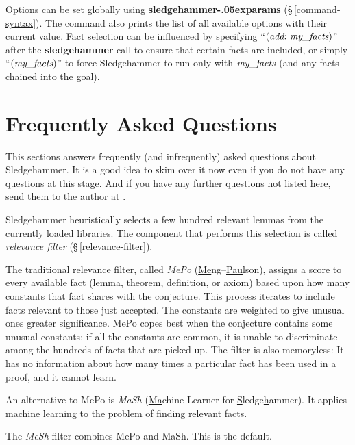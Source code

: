 \documentclass[a4paper,12pt]{article}
\let\oldS=\S
\def\S{\oldS\,}
\renewcommand\_{\hbox{\textunderscore\kern-.05ex}}
\begin{document}
Options can be set globally using \textbf{sledgehammer\_params}
(\S\ref{command-syntax}). The command also prints the list of all available
options with their current value. Fact selection can be influenced by specifying
``$(\textit{add}{:}~\textit{my\_facts})$'' after the \textbf{sledgehammer} call
to ensure that certain facts are included, or simply ``$(\textit{my\_facts})$''
to force Sledgehammer to run only with $\textit{my\_facts}$ (and any facts
chained into the goal).

\section{Frequently Asked Questions}
\label{frequently-asked-questions}

This sections answers frequently (and infrequently) asked questions about
Sledgehammer. It is a good idea to skim over it now even if you do not have any
questions at this stage. And if you have any further questions not listed here,
send them to the author at \authoremail.


Sledgehammer heuristically selects a few hundred relevant lemmas from the
currently loaded libraries. The component that performs this selection is
called \emph{relevance filter} (\S\ref{relevance-filter}).

\begin{enum}
\item[\labelitemi]
The traditional relevance filter, called \emph{MePo}
(\underline{Me}ng--\underline{Pau}lson), assigns a score to every available fact
(lemma, theorem, definition, or axiom) based upon how many constants that fact
shares with the conjecture. This process iterates to include facts relevant to
those just accepted. The constants are weighted to give unusual ones greater
significance. MePo copes best when the conjecture contains some unusual
constants; if all the constants are common, it is unable to discriminate among
the hundreds of facts that are picked up. The filter is also memoryless: It has
no information about how many times a particular fact has been used in a proof,
and it cannot learn.

\item[\labelitemi]
An alternative to MePo is \emph{MaSh} (\underline{Ma}chine Learner for
\underline{S}ledge\underline{h}ammer). It applies machine learning to the
problem of finding relevant facts.

\item[\labelitemi] The \emph{MeSh} filter combines MePo and MaSh. This is
the default.
\end{enum}
\end{document}
